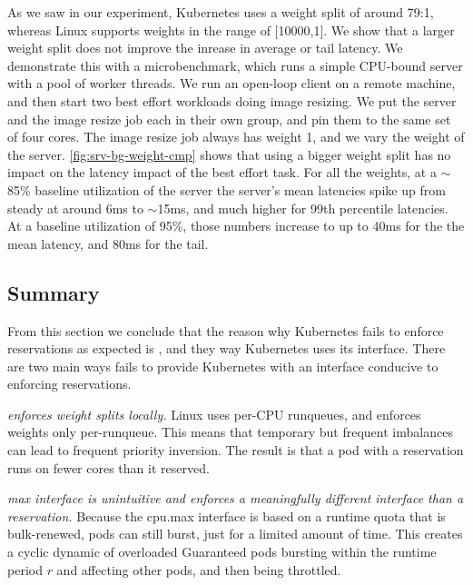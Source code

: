 As we saw in our experiment, Kubernetes uses a weight split of around 79:1,
whereas Linux supports weights in the range of [10000,1]. We show that a larger
weight split does not improve the inrease in average or tail latency. We
demonstrate this with a microbenchmark, which runs a simple CPU-bound server
with a pool of worker threads. We run an open-loop client on a remote machine,
and then start two best effort workloads doing image resizing. We put the server
and the image resize job each in their own \cgroups{} group, and pin them to the
same set of four cores. The image resize job always has weight 1, and we vary
the weight of the server. \autoref{fig:srv-bg-weight-cmp} shows that using a
bigger weight split has no impact on the latency impact of the best effort task.
For all the weights, at a $\sim$85\% baseline utilization of the server the
server's mean latencies spike up from steady at around 6ms to $\sim$15ms, and
much higher for 99th percentile latencies. At a baseline utilization of 95\%,
those numbers increase to up to 40ms for the the mean latency, and 80ms for the
tail.

\subsection{Summary}

From this section we conclude that the reason why Kubernetes fails to enforce
reservations as expected is \cgroups{}, and they way Kubernetes uses its
interface. There are two main ways \cgroups{} fails to provide Kubernetes with
an interface conducive to enforcing reservations.

\textit{\cgroups{} enforces weight splits locally.} Linux uses per-CPU
runqueues, and enforces weights only per-runqueue. This means that temporary but
frequent imbalances can lead to frequent priority inversion. The result is that
a pod with a reservation runs on fewer cores than it reserved.

\textit{\cgroups{} max interface is unintuitive and enforces a meaningfully
different interface than a reservation.} Because the cpu.max interface is based
on a runtime quota that is bulk-renewed, pods can still burst, just for a
limited amount of time. This creates a cyclic dynamic of overloaded Guaranteed
pods bursting within the runtime period $r$ and affecting other pods, and then
being throttled.



